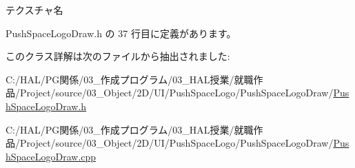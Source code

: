 テクスチャ名 



 Push\+Space\+Logo\+Draw.\+h の 37 行目に定義があります。



このクラス詳解は次のファイルから抽出されました\+:\begin{DoxyCompactItemize}
\item 
C\+:/\+H\+A\+L/\+P\+G関係/03\+\_\+作成プログラム/03\+\_\+\+H\+A\+L授業/就職作品/\+Project/source/03\+\_\+\+Object/2\+D/\+U\+I/\+Push\+Space\+Logo/\+Push\+Space\+Logo\+Draw/\mbox{\hyperlink{_push_space_logo_draw_8h}{Push\+Space\+Logo\+Draw.\+h}}\item 
C\+:/\+H\+A\+L/\+P\+G関係/03\+\_\+作成プログラム/03\+\_\+\+H\+A\+L授業/就職作品/\+Project/source/03\+\_\+\+Object/2\+D/\+U\+I/\+Push\+Space\+Logo/\+Push\+Space\+Logo\+Draw/\mbox{\hyperlink{_push_space_logo_draw_8cpp}{Push\+Space\+Logo\+Draw.\+cpp}}\end{DoxyCompactItemize}
